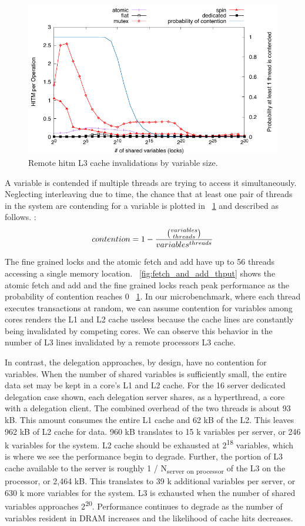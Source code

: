 \documentclass{uicthesi}
\begin{document}
\begin{figure}[ht!]
\centering
\includegraphics[width=0.9\columnwidth]{FIG/hitm_per_op.pdf}
\caption{Remote hitm L3 cache invalidations by variable size. }
\label{fig:contention}
\end{figure}

A variable is contended if multiple threads are trying to access it simultaneously. Neglecting interleaving due to time, the chance that at least one pair of threads in the system are contending for a variable is plotted in ~\ref{fig:contention} and described as follows. : 
\begin{displaymath}
contention = 1 - {{ variables \choose threads }  \over  variables^{threads}}
\end{displaymath}


The fine grained locks and the atomic fetch and add have up to 56 threads accessing a single memory location. ~\ref{fig:fetch_and_add_thput} shows the atomic fetch and add and the fine grained locks reach peak performance as the probability of contention reaches 0 ~\ref{fig:contention}. In our microbenchmark, where each thread executes transactions at random, we can assume contention for variables among cores renders the L1 and L2 cache useless because the cache lines are constantly being invalidated by competing cores. We can observe this behavior in the number of L3 lines invalidated by a remote processors L3 cache. 

In contrast, the delegation approaches, by design, have no contention for variables. When the number of shared variables is sufficiently small, the entire data set may be kept in a core's L1 and L2 cache. For the 16 server dedicated delegation case shown, each delegation server shares, as a hyperthread, a core with a delegation client. The combined overhead of the two threads is about 93 kB. This amount consumes the entire L1 cache and 62 kB of the L2. This leaves 962 kB of L2 cache for data. 960 kB translates to 15 k variables per server, or 246 k variables for the system. L2 cache should be exhausted at 2\textsuperscript{18} variables, which is where we see the performance begin to degrade. Further, the portion of L3 cache available to the server is roughly 1 / N\textsubscript{server on processor} of the L3 on the processor, or 2,464 kB. This translates to 39 k additional variables per server, or 630 k more variables for the system. L3 is exhausted when the number of shared variables approaches 2\textsuperscript{20}. Performance continues to degrade as the number of variables resident in DRAM increases and the likelihood of cache hits decreases. 
\end{document}
